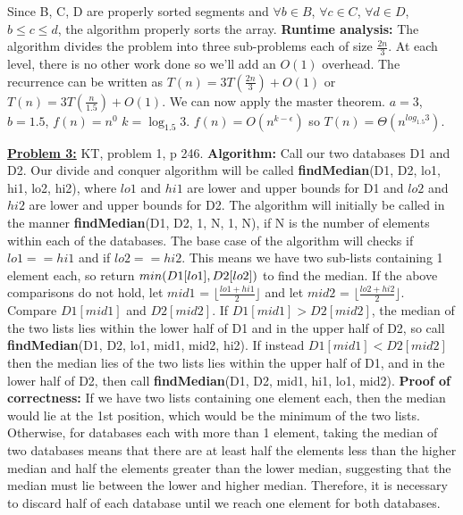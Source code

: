 \documentclass[11pt]{article}
\begin{document}
\begin{flushleft}
		\newline
		Since B, C, D are properly sorted segments and $\forall b \in B$, $\forall c \in C$, $\forall d \in D$, $b \leq c \leq d$, the algorithm properly sorts the array.
		\newline
		\textbf{Runtime analysis:} The algorithm divides the problem into three sub-problems each of size $\frac{2n}{3}$. At each level, there is no other work done so we'll add an $O(1)$ overhead. The recurrence can be written as $T(n) = 3T(\frac{2n}{3}) + O(1)$ or $T(n) = 3T(\frac{n}{1.5}) + O(1)$. We can now apply the master theorem. $a = 3$, $b = 1.5$, $f(n) = n^0$ $k = \log_{1.5}3$. $f(n) = O(n^{k - \epsilon})$ so $T(n) = \Theta(n^{log_{1.5}3})$.
		\newline
		\item \textbf {\underline{Problem 3:}} KT, problem 1, p 246.
		\newline
		\textbf{Algorithm:} Call our two databases D1 and D2. Our divide and conquer algorithm will be called \textbf{findMedian}(D1, D2, lo1, hi1, lo2, hi2), where $lo1$ and $hi1$ are lower and upper bounds for D1 and $lo2$ and $hi2$ are lower and upper bounds for D2. The algorithm will initially be called in the manner \textbf{findMedian}(D1, D2, 1, N, 1, N), if N is the number of elements within each of the databases. The base case of the algorithm will checks if $lo1 == hi1$ and if $lo2 == hi2$. This means we have two sub-lists containing 1 element each, so return $min(D1[lo1],\space D2[lo2])$ to find the median.
		\newline
		If the above comparisons do not hold, let $mid1$ = $\lfloor \frac{lo1 + hi1}{2} \rfloor$
		and let $mid2$ = $\lfloor \frac{lo2 + hi2}{2} \rfloor$. Compare $D1[mid1]$ and $D2[mid2]$. If $D1[mid1] > D2[mid2]$, the median of the two lists lies within the lower half of D1 and in the upper half of D2, so call 
		\textbf{findMedian}(D1, D2, lo1, mid1, mid2, hi2). 
		\newline
		If instead $D1[mid1] < D2[mid2]$ then the median lies of the two lists lies within the upper half of D1, and in the lower half of D2, then call \textbf{findMedian}(D1, D2, mid1, hi1, lo1, mid2). 
		\newline
		\newline
		\textbf{Proof of correctness:} If we have two lists containing one element each, then the median would lie at the 1st position, which would be the minimum of the two lists. Otherwise, for databases each with more than 1 element, taking the median of two databases means that there are at least half the elements less than the higher median and half the elements greater than the lower median, suggesting that the median must lie between the lower and higher median. Therefore, it is necessary to discard half of each database until we reach one element for both databases. 

\end{flushleft}
\end{document}
